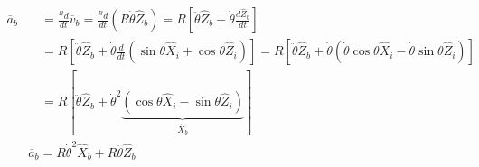 \documentclass[]{aiaa-tc}%
\begin{document}
\begin{equation} \label{derV}
\begin{split}
  \overline{a}_b &\quad= \frac{^Bd}{dt} \overline{v}_b = \frac{^Bd}{dt}(R\dot{\theta}\hat{Z}_b) =  R \left[ \ddot{\theta}\hat{Z}_b + \dot{\theta}\frac{d\hat{Z}_b}{dt}\right] \\
  &\quad= R \left[ \ddot{\theta}\hat{Z}_b + \dot{\theta} \frac{d}{dt}(\sin\theta\hat{X}_i + \cos\theta\hat{Z}_i)\right]
  =  R \left[ \ddot{\theta}\hat{Z}_b + \dot{\theta} (\dot{\theta}\cos\theta\hat{X}_i - \dot{\theta}\sin\theta\hat{Z}_i)\right] \\
  &\quad= R [ \ddot{\theta}\hat{Z}_b + \dot{\theta}^2 \underbrace{ (\cos\theta\hat{X}_i - \sin\theta\hat{Z}_i) }_{\hat{X}_b} ] \\
  &\boxed{\overline{a}_b = R\dot{\theta}^2 \hat{X}_b + R\ddot{\theta} \hat{Z}_b}
\end{split}
\end{equation}
\end{document}
